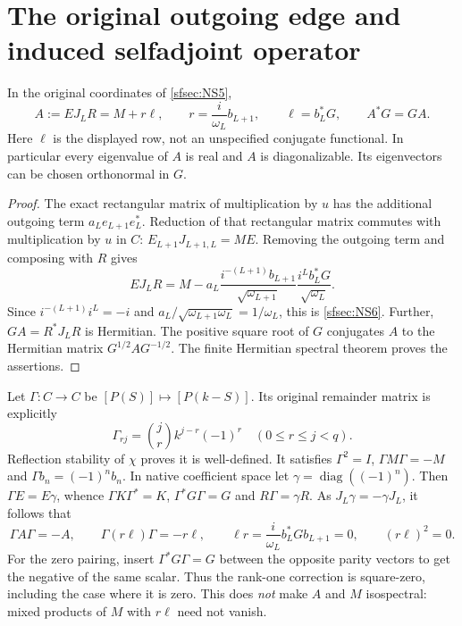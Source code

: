 \documentclass[11pt]{article}
\begin{document}
\section{The original outgoing edge and induced selfadjoint operator}

\begin{sfsectheorem}\label{sfsec:thm:receiver}
In the original coordinates of \eqref{sfsec:NS5},
\begin{equation}\tag{NS6}\label{sfsec:NS6}
A:=EJ_LR=M+r\ell,\qquad
r=\frac{i}{\omega_L}b_{L+1},\qquad
\ell=b_L^*G,\qquad A^*G=GA .
\end{equation}
Here $\ell$ is the displayed row, not an unspecified
conjugate functional. In particular every eigenvalue of $A$
is real and $A$ is diagonalizable. Its eigenvectors can be
chosen orthonormal in $G$.
\end{sfsectheorem}
\begin{proof}
The exact rectangular matrix of multiplication by $u$ has
the additional outgoing term $a_Le_{L+1}e_L^*$.
Reduction of that rectangular matrix commutes with
multiplication by $u$ in $C$:
$E_{L+1}J_{L+1,L}=ME$. Removing the outgoing term and
composing with $R$ gives
\[
EJ_LR=M-a_L\frac{i^{-(L+1)}b_{L+1}}{\sqrt{\omega_{L+1}}}
              \frac{i^Lb_L^*G}{\sqrt{\omega_L}}.
\]
Since $i^{-(L+1)}i^L=-i$ and
$a_L/\sqrt{\omega_{L+1}\omega_L}=1/\omega_L$,
this is \eqref{sfsec:NS6}. Further,
$GA=R^*J_LR$ is Hermitian. The positive square root of $G$
conjugates $A$ to the Hermitian matrix $G^{1/2}AG^{-1/2}$.
The finite Hermitian spectral theorem proves the assertions.
\end{proof}

Let $\Gamma:C\to C$ be $[P(S)]\mapsto[P(k-S)]$.
Its original remainder matrix is explicitly
\begin{equation}\tag{NS7}\label{sfsec:NS7}
\Gamma_{rj}=\binom jr k^{j-r}(-1)^r\quad(0\leq r\leq j<q).
\end{equation}
Reflection stability of $\chi$ proves it is well-defined.
It satisfies $\Gamma^2=I$, $\Gamma M\Gamma=-M$ and
$\Gamma b_n=(-1)^nb_n$.
In native coefficient space let $\gamma=\operatorname{diag}((-1)^n)$.
Then $\Gamma E=E\gamma$, whence
$\Gamma K\Gamma^*=K$, $\Gamma^*G\Gamma=G$ and
$R\Gamma=\gamma R$. As $J_L\gamma=-\gamma J_L$, it follows that
\begin{equation}\tag{NS8}\label{sfsec:NS8}
\Gamma A\Gamma=-A,\qquad
\Gamma(r\ell)\Gamma=-r\ell,\qquad
\ell r=\frac{i}{\omega_L}b_L^*Gb_{L+1}=0,\qquad
(r\ell)^2=0 .
\end{equation}
For the zero pairing, insert $\Gamma^*G\Gamma=G$ between the
opposite parity vectors to get the negative of the same scalar.
Thus the rank-one correction is square-zero, including the
case where it is zero. This does \emph{not} make $A$ and $M$
isospectral: mixed products of $M$ with $r\ell$ need not vanish.
\end{document}
